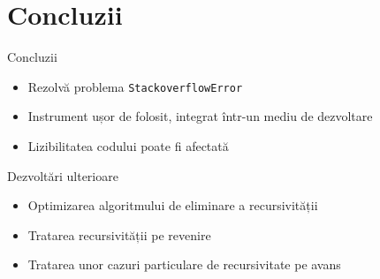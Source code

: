 \documentclass{beamer}
\def\code#1{\texttt{#1}}
\begin{document}

\section{Concluzii}

\begin{frame}{Concluzii}
    \begin{itemize}
        \item Rezolvă problema \code{StackoverflowError}
        \item Instrument ușor de folosit, integrat într-un mediu de dezvoltare
        \item Lizibilitatea codului poate fi afectată
    \end{itemize}
\end{frame}

\begin{frame}{Dezvoltări ulterioare}
	\begin{itemize}
        \item Optimizarea algoritmului de eliminare a recursivității
		\item Tratarea recursivității pe revenire
        \item Tratarea unor cazuri particulare de recursivitate pe avans
	\end{itemize}
\end{frame}
\end{document}
